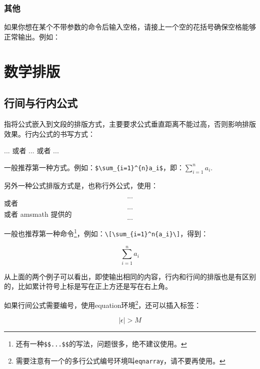 {\subsection{其他}
如果你想在某个不带参数的命令后输入空格，请接上一个空的花括号确保空格能够正常输出。例如：

\chapter{数学排版}
\section{行间与行内公式}
指将公式嵌入到文段的排版方式，主要要求公式垂直距离不能过高，否则影响排版效果。行内公式的书写方式：
\begin{latex}{}
$...$ 或者 \(...\) 或者 \begin{math}...\end{math}
\end{latex}

一般推荐第一种方式。例如：\verb|$\sum_{i=1}^{n}a_i$|，即：$\sum_{i=1}^{n}a_i$.

另外一种公式排版方式是，也称行外公式，使用：
\begin{latex}{}
\[...\] 或者 \begin{displaymath}...\end{displaymath}
或者 amsmath 提供的\begin{equation*}...\end{equation*}
\end{latex}

一般也推荐第一种命令\footnote{还有一种\texttt{\$\$...\$\$}的写法，问题很多，绝不建议使用。}，例如：\verb|\[\sum_{i=1}^n{a_i}\]|，得到：

\[\sum_{i=1}^{n}a_i\]

从上面的两个例子可以看出，即使输出相同的内容，行内和行间的排版也是有区别的，比如累计符号上标是写在正上方还是写在右上角。

如果行间公式需要编号，使用equation环境\footnote{需要注意有一个的多行公式编号环境叫\texttt{eqnarray}，请不要再使用。}，还可以插入标签：

\begin{codeshow}
\begin{equation}
\label{eq:NoExample}
  |\epsilon|>M
\end{equation}
\end{codeshow}

}
